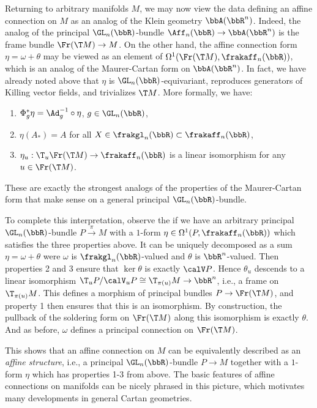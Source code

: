 \begin{rem}\label{rem 1.3.6 Cap}
    Returning to arbitrary manifolds $M$, we may now view the data defining an affine connection on $M$ as an analog of the Klein geometry $\bbA(\bbR^n)$. Indeed, the analog of the principal $\GL_n(\bbR)$-bundle $\Aff_n(\bbR)\to \bbA(\bbR^n)$ is the frame bundle $\Fr(\T M)\to M$. On the other hand, the affine connection form $\eta=\omega+\theta$ may be viewed as an element of $\Omega^1(\Fr(\T M),\frakaff_n(\bbR))$, which is an analog of the Maurer-Cartan form on $\bbA(\bbR^n)$. In fact, we have already noted above that $\eta$ is $\GL_n(\bbR)$-equivariant, reproduces generators of Killing vector fields, and trivializes $\T M$. More formally, we have:
    \begin{enumerate}
        \item $\Phi_g^\ast \eta=\Ad_g^{-1}\circ \eta$, $g\in\GL_n(\bbR)$,
        \item $\eta(A_\ast)=A$ for all $X\in\frakgl_n(\bbR)\subset\frakaff_n(\bbR)$,
        \item $\eta_u:\T_u\Fr(\T M)\to \frakaff_n(\bbR)$ is a linear isomorphism for any $u\in\Fr(\T M)$.
    \end{enumerate}
    These are exactly the strongest analogs of the properties of the Maurer-Cartan form that make sense on a general principal $\GL_n(\bbR)$-bundle.

    To complete this interpretation, observe the if we have an arbitrary principal $\GL_n(\bbR)$-bundle $P\overset{\pi}{\to}M$ with a $1$-form $\eta\in\Omega^1(P,\frakaff_n(\bbR))$ which satisfies the three properties above. It can be uniquely decomposed as a sum $\eta=\omega+\theta$ were $\omega$ is $\frakgl_n(\bbR)$-valued and $\theta$ is $\bbR^n$-valued. Then properties 2 and 3 ensure that $\ker\theta$ is exactly $\calV P$. Hence $\theta_u$ descends to a linear isomorphism $\T_u P\slash \calV_u P\cong \T_{\pi(u)}M\to \bbR^n$, i.e., a frame on $\T_{\pi(u)}M$. This defines a morphism of principal bundles $P\to \Fr(\T M)$, and property 1 then ensures that this is an isomorphism. By construction, the pullback of the soldering form on $\Fr(\T M)$ along this isomorphism is exactly $\theta$. And as before, $\omega$ defines a principal connection on $\Fr(\T M)$.

    This shows that an affine connection on $M$ can be equivalently described as an \emph{affine structure}, i.e., a principal $\GL_n(\bbR)$-bundle $P\to M$ together with a $1$-form $\eta$ which has properties 1-3 from above. The basic features of affine connections on manifolds can be nicely phrased in this picture, which motivates many developments in general Cartan geometries.
\end{rem}



